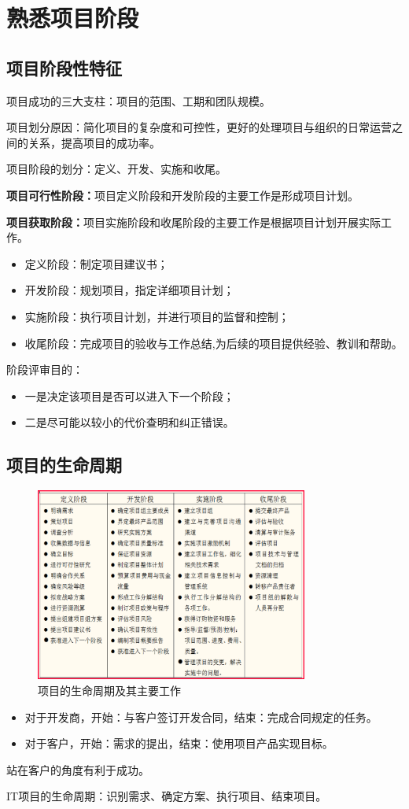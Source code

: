 \section{熟悉项目阶段}
\subsection{项目阶段性特征}
项目成功的三大支柱：项目的范围、工期和团队规模。
\par 项目划分原因：简化项目的复杂度和可控性，更好的处理项目与组织的日常运营之间的关系，提高项目的成功率。
\par 项目阶段的划分：定义、开发、实施和收尾。
\par \textbf{项目可行性阶段：}项目定义阶段和开发阶段的主要工作是形成项目计划。
\par \textbf{项目获取阶段：}项目实施阶段和收尾阶段的主要工作是根据项目计划开展实际工作。
\begin{itemize}
	\item 定义阶段：制定项目建议书；
	\item 开发阶段：规划项目，指定详细项目计划；
	\item 实施阶段：执行项目计划，并进行项目的监督和控制；
	\item 收尾阶段：完成项目的验收与工作总结,为后续的项目提供经验、教训和帮助。
\end{itemize}
阶段评审目的：
\begin{itemize}
	\item 一是决定该项目是否可以进入下一个阶段；
	\item 二是尽可能以较小的代价查明和纠正错误。
\end{itemize}
\subsection{项目的生命周期}
\begin{figure}[!h]
	\centering
	\includegraphics[width=0.8\textwidth]{image/2-1}
	\caption{项目的生命周期及其主要工作}
\end{figure}
\begin{itemize}
	\item 对于开发商，开始：与客户签订开发合同，结束：完成合同规定的任务。
	\item 对于客户，开始：需求的提出，结束：使用项目产品实现目标。
\end{itemize}
\par 站在客户的角度有利于成功。
\par IT项目的生命周期：识别需求、确定方案、执行项目、结束项目。
